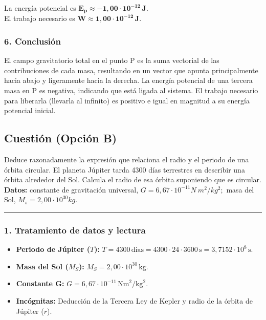 \begin{cajaresultado}
    La energía potencial es $\boldsymbol{E_p \approx -1,00\cdot10^{-12}\,\textbf{J}}$. \\
    El trabajo necesario es $\boldsymbol{W \approx 1,00\cdot10^{-12}\,\textbf{J}}$.
\end{cajaresultado}
\subsubsection*{6. Conclusión}
\begin{cajaconclusion}
El campo gravitatorio total en el punto P es la suma vectorial de las contribuciones de cada masa, resultando en un vector que apunta principalmente hacia abajo y ligeramente hacia la derecha. La energía potencial de una tercera masa en P es negativa, indicando que está ligada al sistema. El trabajo necesario para liberarla (llevarla al infinito) es positivo e igual en magnitud a su energía potencial inicial.
\end{cajaconclusion}

\newpage

\subsection{Cuestión (Opción B)}
\label{subsec:B1_2016_jun_ord_re}

\begin{cajaenunciado}
Deduce razonadamente la expresión que relaciona el radio y el periodo de una órbita circular. El planeta Júpiter tarda 4300 días terrestres en describir una órbita alrededor del Sol. Calcula el radio de esa órbita suponiendo que es circular.
\textbf{Datos:} constante de gravitación universal, $G=6,67\cdot10^{-11}N~m^{2}/kg^{2};$ masa del Sol, $M_{s}=2,00\cdot10^{30}kg$.
\end{cajaenunciado}
\hrule

\subsubsection*{1. Tratamiento de datos y lectura}
\begin{itemize}
    \item \textbf{Periodo de Júpiter ($T$):} $T = 4300\,\text{días} = 4300 \cdot 24 \cdot 3600\,\text{s} = 3,7152 \cdot 10^8\,\text{s}$.
    \item \textbf{Masa del Sol ($M_S$):} $M_S = 2,00\cdot10^{30}\,\text{kg}$.
    \item \textbf{Constante G:} $G=6,67\cdot10^{-11}\,\text{Nm}^2/\text{kg}^2$.
    \item \textbf{Incógnitas:} Deducción de la Tercera Ley de Kepler y radio de la órbita de Júpiter ($r$).
\end{itemize}

